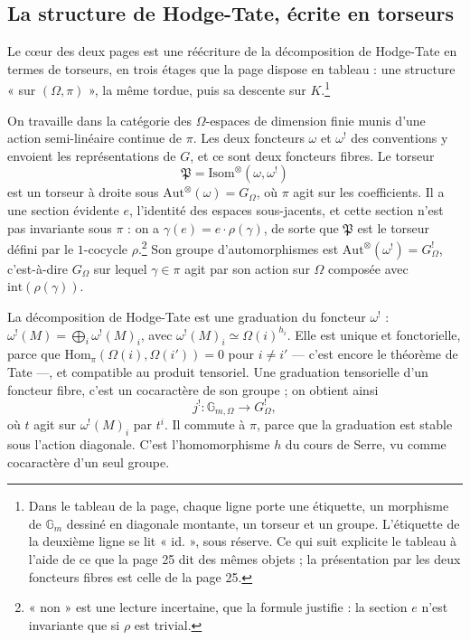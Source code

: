 \documentclass[11pt,a4paper]{article}
\begin{document}
\subsection*{La structure de Hodge-Tate, écrite en torseurs}

Le cœur des deux pages est une réécriture de la décomposition de Hodge-Tate
en termes de torseurs, en trois étages que la page dispose en tableau : une
structure « sur $(\Omega, \pi)$ », la même tordue, puis sa descente sur
$K$.\footnote{Dans le tableau de la page, chaque ligne porte une étiquette, un
morphisme de $\mathbb{G}_m$ dessiné en diagonale montante, un torseur et un
groupe. L'étiquette de la deuxième ligne se lit « id. », sous réserve. Ce qui
suit explicite le tableau à l'aide de ce que la page 25 dit des mêmes objets ;
la présentation par les deux foncteurs fibres est celle de la page 25.}

On travaille dans la catégorie des $\Omega$-espaces de dimension finie munis
d'une action semi-linéaire continue de $\pi$. Les deux foncteurs $\omega$ et
$\omega^{!}$ des conventions y envoient les représentations de $G$, et ce sont
deux foncteurs fibres. Le torseur
\[
\mathfrak{P} = \mathrm{Isom}^{\otimes}(\omega, \omega^{!})
\]
est un torseur à droite sous $\mathrm{Aut}^{\otimes}(\omega) = G_{\Omega}$, où
$\pi$ agit sur les coefficients. Il a une section évidente $e$, l'identité des
espaces sous-jacents, et cette section n'est pas invariante sous $\pi$ : on a
$\gamma(e) = e \cdot \rho(\gamma)$, de sorte que $\mathfrak{P}$ est le torseur
défini par le $1$-cocycle $\rho$.\footnote{« non » est une lecture incertaine,
que la formule justifie : la section $e$ n'est invariante que si $\rho$ est
trivial.} Son groupe d'automorphismes est $\mathrm{Aut}^{\otimes}(\omega^{!})
= G^{!}_{\Omega}$, c'est-à-dire $G_{\Omega}$ sur lequel $\gamma \in \pi$ agit
par son action sur $\Omega$ composée avec $\mathrm{int}(\rho(\gamma))$.

La décomposition de Hodge-Tate est une graduation du foncteur $\omega^{!}$ :
$\omega^{!}(M) = \bigoplus_i \omega^{!}(M)_i$, avec $\omega^{!}(M)_i \simeq
\Omega(i)^{h_i}$. Elle est unique et fonctorielle, parce que
$\mathrm{Hom}_{\pi}(\Omega(i), \Omega(i')) = 0$ pour $i \neq i'$ --- c'est
encore le théorème de Tate ---, et compatible au produit tensoriel. Une
graduation tensorielle d'un foncteur fibre, c'est un cocaractère de son
groupe ; on obtient ainsi
\[
j^{!} : \mathbb{G}_{m,\Omega} \longrightarrow G^{!}_{\Omega},
\]
où $t$ agit sur $\omega^{!}(M)_i$ par $t^i$. Il commute à $\pi$, parce que la
graduation est stable sous l'action diagonale. C'est l'homomorphisme $h$ du
cours de Serre, vu comme cocaractère d'un seul groupe.
\end{document}

